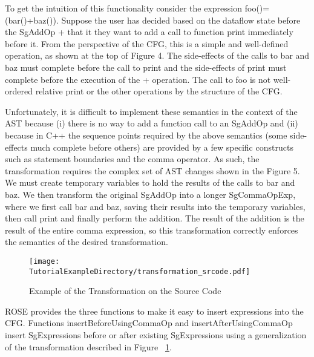 {To get the intuition of this functionality consider the expression {\scriptsize foo()=(bar()+baz())}. Suppose the user has decided based on the dataflow state before the {\scriptsize SgAddOp +} that it they want to add a call to function {\scriptsize print} immediately before it. From the perspective of the CFG, this is a simple and well-defined operation, as shown at the top of Figure 4. The side-effects of the calls to {\scriptsize bar} and {\scriptsize baz} must complete before the call to print and the side-effects of print must complete before the execution of the + operation. The call to {\scriptsize foo} is not well-ordered relative print or the other operations by the structure of the CFG.

Unfortunately, it is difficult to implement these semantics in the context of the AST because (i) there is no way to add a function call to an {\scriptsize SgAddOp} and (ii) because in C++ the sequence points required by the above semantics (some side-effects much complete before others) are provided by a few specific constructs such as statement boundaries and the comma operator. As such, the transformation requires the complex set of AST changes shown in the Figure 5. We must create temporary variables to hold the results of the calls to bar and baz. We then transform the original {\scriptsize SgAddOp} into a longer {\scriptsize SgCommaOpExp}, where we first call {\scriptsize bar} and {\scriptsize baz}, saving their results into the temporary variables, then call print and finally perform the addition. The result of the addition is the result of the entire comma expression, so this transformation correctly enforces the semantics of the desired transformation.


\begin{figure}
\texttt{[image: \\TutorialExampleDirectory/transformation\_srcode.pdf]}
\caption{Example of the Transformation on the Source Code}
\label{tr_srcode}
\end{figure}

ROSE provides the three functions to make it easy to insert expressions into the CFG. Functions {\scriptsize insertBeforeUsingCommaOp} and {\scriptsize insertAfterUsingCommaOp} insert {\scriptsize SgExpressions} before or after existing {\scriptsize SgExpressions} using a generalization of the transformation described in Figure ~\ref{tr_srcode}. 

}

